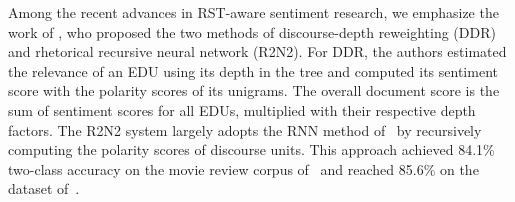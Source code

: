 Among the recent advances in RST-aware sentiment research, we
emphasize the work of , who
proposed the two methods of discourse-depth reweighting (DDR)
 and rhetorical recursive neural network (R2N2).
For DDR, the authors estimated the relevance of an EDU using its depth in the tree and computed its sentiment score with the polarity scores of its unigrams.
The overall 
document score is the sum of sentiment scores for all EDUs,
multiplied with their respective depth factors.
The R2N2 system largely adopts the RNN method
of~ by recursively computing the polarity scores of
discourse units.
This approach achieved
84.1\% two-class accuracy on the movie review corpus
of~ and reached 85.6\% on the dataset
of~.

